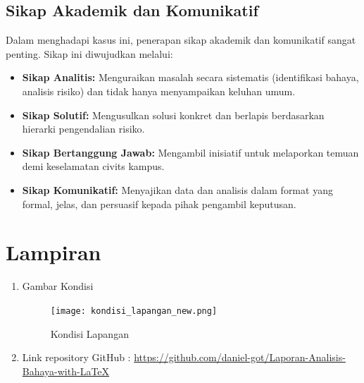 \documentclass[a4paper, 12pt]{article}
\begin{document}
\subsection{Sikap Akademik dan Komunikatif}
Dalam menghadapi kasus ini, penerapan sikap akademik dan komunikatif sangat penting. Sikap ini diwujudkan melalui:
\begin{itemize}
    \item \textbf{Sikap Analitis:} Menguraikan masalah secara sistematis (identifikasi bahaya, analisis risiko) dan tidak hanya menyampaikan keluhan umum.
    \item \textbf{Sikap Solutif:} Mengusulkan solusi konkret dan berlapis berdasarkan hierarki pengendalian risiko.
    \item \textbf{Sikap Bertanggung Jawab:} Mengambil inisiatif untuk melaporkan temuan demi keselamatan civits kampus.
    \item \textbf{Sikap Komunikatif:} Menyajikan data dan analisis dalam format yang formal, jelas, dan persuasif kepada pihak pengambil keputusan.
\end{itemize}
\section{Lampiran}
\begin{enumerate}
  \item Gambar Kondisi 

  \begin{figure}[H]
    \centering
    \texttt{[image: kondisi\_lapangan\_new.png]}
    \caption{Kondisi Lapangan}
  \end{figure}  
\item Link repository GitHub : \url{https://github.com/daniel-got/Laporan-Analisis-Bahaya-with-LaTeX}

\end{enumerate}

\end{document}
